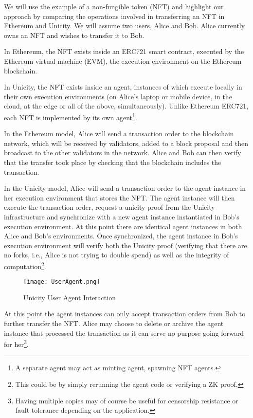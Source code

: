 \documentclass{article}
\begin{document}
We will use the example of a non-fungible token (NFT) and highlight our approach by comparing the operations involved in transferring an NFT in Ethereum and Unicity.  We will assume two users, Alice and Bob. Alice currently owns an NFT and wishes to transfer it to Bob.

In Ethereum, the NFT exists inside an ERC721 smart contract, executed by the Ethereum virtual machine (EVM), the execution environment on the Ethereum blockchain.



In Unicity, the NFT exists inside an agent, instances of which execute locally in their own execution environments (on Alice's laptop or mobile device, in the cloud, at the edge or all of the above, simultaneously). Unlike Ethereum ERC721, each NFT is implemented by its own agent\footnote{A separate agent may act as minting agent, spawning NFT agents.}.


In the Ethereum model, Alice will send a transaction order to the blockchain network, which will be received by validators, added to a block proposal and then broadcast to the other validators in the network. Alice and Bob can then verify that the transfer took place by checking that the blockchain includes the transaction.


In the Unicity model, Alice will send a transaction order to the agent instance in her execution environment that stores the NFT. The agent instance will then execute the transaction order, request a unicity proof from the Unicity infrastructure and synchronize with a new agent instance instantiated in Bob's execution environment. At this point there are identical agent instances in both Alice and Bob's environments. Once synchronized, the agent instance in Bob's execution environment will verify both the Unicity proof (verifying that there are no forks, i.e., Alice is not trying to double spend) as well as the integrity of computation\footnote{This could be by simply rerunning the agent code or verifying a ZK proof.}.

\begin{figure}[htbp]
    \centering
    \texttt{[image: UserAgent.png]}
    \caption{Unicity User Agent Interaction}
    \label{fig:UserAgent}
\end{figure}

At this point the agent instances can only accept transaction orders from Bob to further transfer the NFT. Alice may choose to delete or archive the agent instance that processed the transaction as it can serve no purpose going forward for her\footnote{Having multiple copies may of course be useful for censorship resistance or fault tolerance depending on the application.}.
\end{document}
